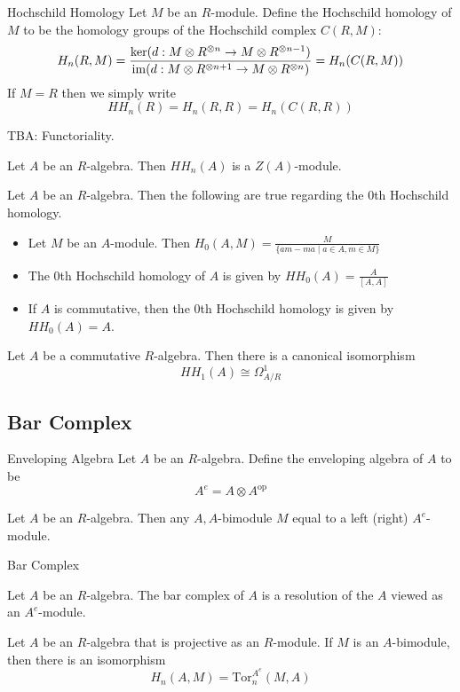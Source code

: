 \documentclass[a4paper]{article}
\begin{document}
\begin{defn}{Hochschild Homology}{} Let $M$ be an $R$-module. Define the Hochschild homology of $M$ to be the homology groups of the Hochschild complex $C(R,M)$: $$H_n(R,M)=\frac{\ker(d:M\otimes R^{\otimes n}\to M\otimes R^{\otimes n-1})}{\operatorname{im}(d:M\otimes R^{\otimes n+1}\to M\otimes R^{\otimes n})}=H_n(C(R,M))$$ If $M=R$ then we simply write $$HH_n(R)=H_n(R,R)=H_n(C(R,R))$$
\end{defn}

TBA: Functoriality. 

\begin{prp}{}{} Let $A$ be an $R$-algebra. Then $HH_n(A)$ is a $Z(A)$-module. 
\end{prp}

\begin{prp}{}{} Let $A$ be an $R$-algebra. Then the following are true regarding the $0$th Hochschild homology. 
\begin{itemize}
\item Let $M$ be an $A$-module. Then $H_0(A,M)=\frac{M}{\{am-ma\;|\;a\in A, m\in M\}}$
\item The $0$th Hochschild homology of $A$ is given by $HH_0(A)=\frac{A}{[A,A]}$
\item If $A$ is commutative, then the $0$th Hochschild homology is given by $HH_0(A)=A$. 
\end{itemize}
\end{prp}

\begin{thm}{}{} Let $A$ be a commutative $R$-algebra. Then there is a canonical isomorphism $$HH_1(A)\cong\Omega_{A/R}^1$$
\end{thm}

\subsection{Bar Complex}
\begin{defn}{Enveloping Algebra}{} Let $A$ be an $R$-algebra. Define the enveloping algebra of $A$ to be $$A^e=A\otimes A^\text{op}$$
\end{defn}

\begin{prp}{}{} Let $A$ be an $R$-algebra. Then any $A,A$-bimodule $M$ equal to a left (right) $A^e$-module. 
\end{prp}

\begin{defn}{Bar Complex}{}
\end{defn}

\begin{prp}{}{} Let $A$ be an $R$-algebra. The bar complex of $A$ is a resolution of the $A$ viewed as an $A^e$-module. 
\end{prp}

\begin{thm}{}{} Let $A$ be an $R$-algebra that is projective as an $R$-module. If $M$ is an $A$-bimodule, then there is an isomorphism $$H_n(A,M)=\text{Tor}_n^{A^e}(M,A)$$
\end{thm}
\end{document}
